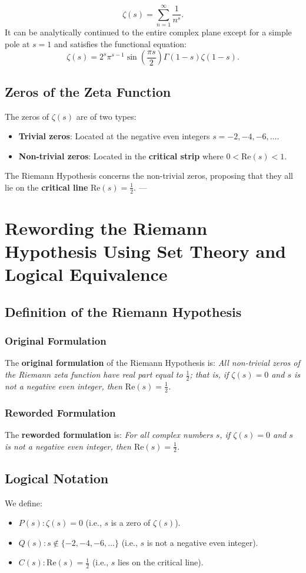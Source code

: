 \documentclass{article}
\begin{document}
\begin{equation}
\zeta(s) = \sum_{n=1}^{\infty} \frac{1}{n^{s}}.
\end{equation} It can be analytically continued to the entire complex plane except for a simple pole at $s = 1$ and satisfies the functional equation: \begin{equation}
\zeta(s) = 2^{s} \pi^{s-1} \sin\left( \dfrac{\pi s}{2} \right) \Gamma(1 - s) \zeta(1 - s).
\end{equation} \subsection{Zeros of the Zeta Function} The zeros of $\zeta(s)$ are of two types: \begin{itemize} \item \textbf{Trivial zeros}: Located at the negative even integers $s = -2, -4, -6, \ldots$. \item \textbf{Non-trivial zeros}: Located in the \textbf{critical strip} where $0 < \mathrm{Re}(s) < 1$.
\end{itemize} The Riemann Hypothesis concerns the non-trivial zeros, proposing that they all lie on the \textbf{critical line} $\mathrm{Re}(s) = \tfrac{1}{2}$. --- \section{Rewording the Riemann Hypothesis Using Set Theory and Logical Equivalence} \subsection{Definition of the Riemann Hypothesis} \subsubsection{Original Formulation} The \textbf{original formulation} of the Riemann Hypothesis is: \emph{All non-trivial zeros of the Riemann zeta function have real part equal to $\tfrac{1}{2}$; that is, if $\zeta(s) = 0$ and $s$ is not a negative even integer, then $\mathrm{Re}(s) = \tfrac{1}{2}$.} \subsubsection{Reworded Formulation} The \textbf{reworded formulation} is: \emph{For all complex numbers $s$, if $\zeta(s) = 0$ and $s$ is not a negative even integer, then $\mathrm{Re}(s) = \tfrac{1}{2}$.} \subsection{Logical Notation} We define: \begin{itemize} \item $P(s): \zeta(s) = 0$ (i.e., $s$ is a zero of $\zeta(s)$). \item $Q(s): s \notin \{ -2, -4, -6, \ldots \}$ (i.e., $s$ is not a negative even integer). \item $C(s): \mathrm{Re}(s) = \tfrac{1}{2}$ (i.e., $s$ lies on the critical line).

\end{itemize}
\end{document}
